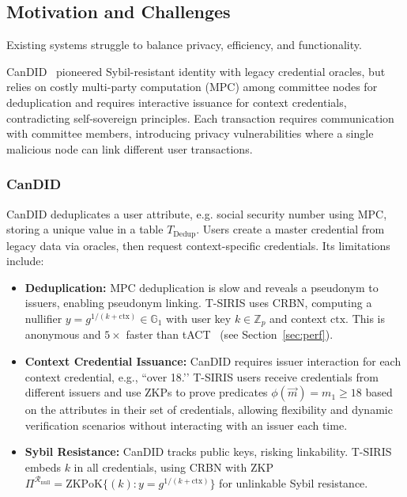 \subsection{Motivation and Challenges}

Existing systems struggle to balance privacy, efficiency, and functionality. 

CanDID~\cite{maram2021candid} pioneered Sybil-resistant identity with legacy credential oracles, but relies on costly multi-party computation (MPC) among committee nodes for deduplication and requires interactive issuance for context credentials, contradicting self-sovereign principles. Each transaction requires communication with committee members, introducing privacy vulnerabilities where a single malicious node can link different user transactions.


\subsubsection*{CanDID}
CanDID deduplicates a user attribute, e.g. social security number using MPC, storing a unique value in a table $T_{\text{Dedup}}$. Users create a master credential from legacy data via oracles, then request context-specific credentials. Its limitations include:

\begin{itemize}
    \item \textbf{Deduplication:} MPC deduplication is slow and reveals a pseudonym to issuers, enabling pseudonym linking. T-SIRIS uses CRBN, computing a nullifier $y = g^{1/(k + \text{ctx})} \in \mathbb{G}_1$ with user key $k \in \mathbb{Z}_p$ and context $\text{ctx}$. This is anonymous and $5\times$ faster than tACT~\cite{rabaninejad_attribute-based_2024} (see Section~\ref{sec:perf}).
    
    \item \textbf{Context Credential Issuance:} CanDID requires issuer interaction for each context credential, e.g., ``over 18.’’ T-SIRIS users receive credentials from different issuers and use ZKPs to prove predicates $\phi(\vec{m}) = m_1 \geq 18$ based on the attributes in their set of credentials, allowing flexibility and dynamic verification scenarios without interacting with an issuer each time. 
    
    \item \textbf{Sybil Resistance:} CanDID tracks public keys, risking linkability. T-SIRIS embeds $k$ in all credentials, using CRBN with ZKP $\Pi^{\mathcal{R}_{\text{null}}} = \text{ZKPoK}\{(k): y = g^{1/(k + \text{ctx})}\}$ for unlinkable Sybil resistance.
\end{itemize}


